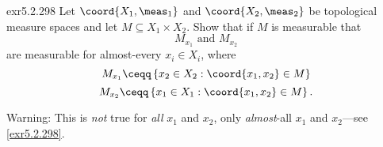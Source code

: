 \begin{exr}{}{exr5.2.298}
Let $\coord{X_1,\meas _1}$ and $\coord{X_2,\meas _2}$ be topological measure spaces and let $M\subseteq X_1\times X_2$.  Show that if $M$ is measurable that
\begin{equation}
M_{x_1}\text{ and }M_{x_2}
\end{equation}
are measurable for almost-every $x_i\in X_i$, where
\begin{equation}
M_{x_1}\ceqq \left\{ x_2\in X_2:\coord{x_1,x_2}\in M\right\}
\end{equation}
\begin{equation}
M_{x_2}\ceqq \left\{ x_1\in X_1:\coord{x_1,x_2}\in M\right\} .
\end{equation}
\begin{wrn}
Warning:  This is \emph{not} true for \emph{all} $x_1$ and $x_2$, only \emph{almost}-all $x_1$ and $x_2$---see \cref{exr5.2.298}.
\end{wrn}
\end{exr}

